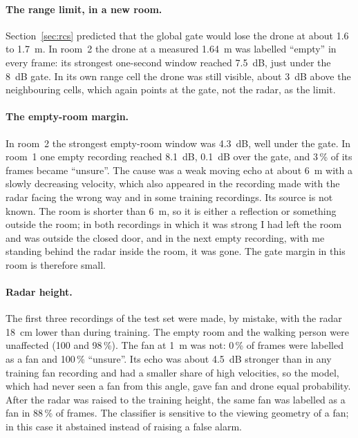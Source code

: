 \documentclass[11pt,a4paper]{article}
\begin{document}
\paragraph{The range limit, in a new room.} Section~\ref{sec:rcs} predicted that the global gate would lose the drone at about \SI{1.6}{} to \SI{1.7}{m}. In room~2 the drone at a measured \SI{1.64}{m} was labelled ``empty'' in every frame: its strongest one-second window reached \SI{7.5}{dB}, just under the \SI{8}{dB} gate. In its own range cell the drone was still visible, about \SI{3}{dB} above the neighbouring cells, which again points at the gate, not the radar, as the limit.

\paragraph{The empty-room margin.} In room~2 the strongest empty-room window was \SI{4.3}{dB}, well under the gate. In room~1 one empty recording reached \SI{8.1}{dB}, \SI{0.1}{dB} over the gate, and 3\,\% of its frames became ``unsure''. The cause was a weak moving echo at about \SI{6}{m} with a slowly decreasing velocity, which also appeared in the recording made with the radar facing the wrong way and in some training recordings. Its source is not known. The room is shorter than \SI{6}{m}, so it is either a reflection or something outside the room; in both recordings in which it was strong I had left the room and was outside the closed door, and in the next empty recording, with me standing behind the radar inside the room, it was gone. The gate margin in this room is therefore small.

\paragraph{Radar height.} The first three recordings of the test set were made, by mistake, with the radar \SI{18}{cm} lower than during training. The empty room and the walking person were unaffected (100 and 98\,\%). The fan at \SI{1}{m} was not: 0\,\% of frames were labelled as a fan and 100\,\% ``unsure''. Its echo was about \SI{4.5}{dB} stronger than in any training fan recording and had a smaller share of high velocities, so the model, which had never seen a fan from this angle, gave fan and drone equal probability. After the radar was raised to the training height, the same fan was labelled as a fan in 88\,\% of frames. The classifier is sensitive to the viewing geometry of a fan; in this case it abstained instead of raising a false alarm.
\end{document}
